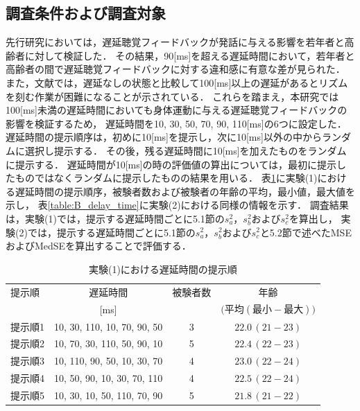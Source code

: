 \subsection{調査条件および調査対象}
\label{subsec:Yobi-conditions}
先行研究\cite{kayama}においては，遅延聴覚フィードバックが発話に与える影響を若年者と高齢者に対して検証した．
その結果，90[ms]を超える遅延時間において，若年者と高齢者の間で遅延聴覚フィードバックに対する違和感に有意な差が見られた．
また，文献\cite{timing-music}では，遅延なしの状態と比較して100[ms]以上の遅延があるとリズムを刻む作業が困難になることが示されている．
これらを踏まえ，本研究では100[ms]未満の遅延時間においても身体運動に与える遅延聴覚フィードバックの影響を検証するため，
遅延時間を10, 30, 50, 70, 90, 110[ms]の6つに設定した．遅延時間の提示順序は，初めに10[ms]を提示し，次に10[ms]以外の中からランダムに選択し提示する．
その後，残る遅延時間に10[ms]を加えたものをランダムに提示する．
遅延時間が10[ms]の時の評価値の算出については，最初に提示したものではなくランダムに提示したものの結果を用いる．
表\ref{table:A_delay_time}に実験(1)における遅延時間の提示順序，被験者数および被験者の年齢の平均，最小値，最大値を示し，
表\ref{table:B_delay_time}に実験(2)における同様の情報を示す．
調査結果は，実験(1)では，提示する遅延時間ごとに5.1節の$s^2_{a}$，$s^2_{b}$および$s^2_{c}$を算出し，
実験(2)では，提示する遅延時間ごとに5.1節の$s^2_{a}$，$s^2_{b}$および$s^2_{c}$と5.2節で述べたMSEおよびMedSEを算出することで評価する．
\begin{table}[tbp]
  \caption{実験(1)における遅延時間の提示順}
  \label{table:A_delay_time}
  \centering
  \begin{tabular}{lccc}
    \hline
    提示順 & 遅延時間 & 被験者数 & 年齢\\
    　& [ms] & & $\bigl(平均 (最小-最大)\bigr)$\\
    \hline \hline
    提示順1  & 10, 30, 110, 10, 70, 90, 50  & 3 & $22.0\, (21-23)$\\
    提示順2  & 10, 70, 30, 110, 50, 90, 10  & 5 & $22.4\, (22-23)$\\
    提示順3  & 10, 110, 90, 50, 10, 30, 70  & 4 & $23.0\, (22-24)$\\
    提示順4  & 10, 50, 90, 10, 30, 70, 110  & 4 & $22.5\, (22-24)$\\
    提示順5  & 10, 30, 10, 50, 110, 70, 90  & 5 & $21.8\, (21-22)$
\\
    \hline
  \end{tabular}
\end{table}

